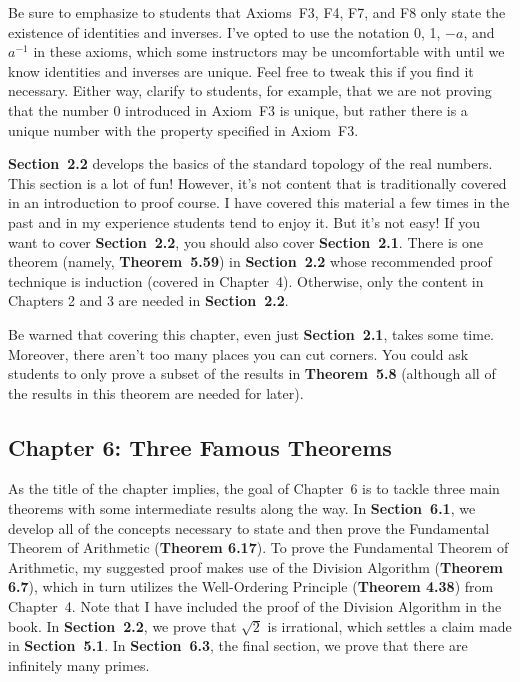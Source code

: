 \documentclass[11pt]{article}%
\newcommand{\blankline}{\pagebreak[2]\vspace{.5\baselineskip}}
\begin{document}
\blankline

Be sure to emphasize to students that Axioms~F3, F4, F7, and F8 only state the existence of identities and inverses. I've opted to use the notation 0, 1, $-a$, and $a^{-1}$ in these axioms, which some instructors may be uncomfortable with until we know identities and inverses are unique. Feel free to tweak this if you find it necessary. Either way, clarify to students, for example, that we are not proving that the number $0$ introduced in Axiom~F3 is unique, but rather there is a unique number with the property specified in Axiom~F3.

\blankline

\textbf{Section~2.2} develops the basics of the standard topology of the real numbers.  This section is a lot of fun!  However, it's not content that is traditionally covered in an introduction to proof course.  I have covered this material a few times in the past and in my experience students tend to enjoy it.  But it's not easy!  If you want to cover \textbf{Section~2.2}, you should also cover \textbf{Section~2.1}.  There is one theorem (namely, \textbf{Theorem~5.59}) in \textbf{Section~2.2} whose recommended proof technique is induction (covered in Chapter~4).  Otherwise, only the content in Chapters 2 and 3 are needed in \textbf{Section~2.2}.

\blankline

Be warned that covering this chapter, even just \textbf{Section~2.1}, takes some time.  Moreover, there aren't too many places you can cut corners.  You could ask students to only prove a subset of the results in \textbf{Theorem~5.8} (although all of the results in this theorem are needed for later).


\subsection*{Chapter 6: Three Famous Theorems}

As the title of the chapter implies, the goal of Chapter~6 is to tackle three main theorems with some intermediate results along the way.  In \textbf{Section~6.1}, we develop all of the concepts necessary to state and then prove the Fundamental Theorem of Arithmetic (\textbf{Theorem 6.17}). To prove the Fundamental Theorem of Arithmetic, my suggested proof makes use of the Division Algorithm (\textbf{Theorem 6.7}), which in turn utilizes the Well-Ordering Principle (\textbf{Theorem 4.38}) from Chapter~4. Note that I have included the proof of the Division Algorithm in the book. In \textbf{Section~2.2}, we prove that $\sqrt{2}$ is irrational, which settles a claim made in \textbf{Section~5.1}. In \textbf{Section~6.3}, the final section, we prove that there are infinitely many primes.  
\end{document}
